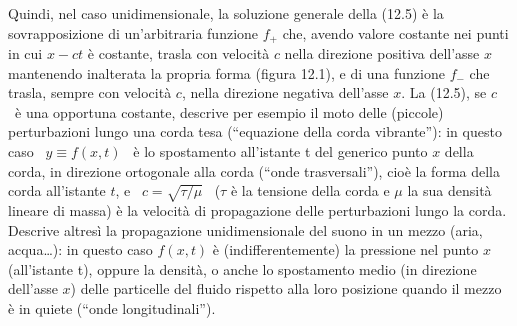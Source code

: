 Quindi, nel caso unidimensionale, la soluzione generale della (12.5) \`e la
sovrapposizione di un'arbitraria funzione $f_+$ che, avendo valore costante nei
punti in cui $x-ct$ \`e costante, trasla con velocit\`a $c$ nella direzione
positiva dell'asse $x$ mantenendo inalterata la propria forma (figura 12.1), e
di una funzione $f_-$ che trasla, sempre con velocit\`a $c$, nella direzione
negativa dell'asse $x$.
La (12.5), se $c$ \ \`e una opportuna costante, descrive per esempio il moto
delle (piccole) perturbazioni lungo una corda tesa (``equazione della corda
vibrante''): in questo caso \ $y\equiv f(x,t)$ \ \`e lo spostamento all'istante
t del generico punto $x$ della corda, in direzione ortogonale alla corda (``onde
trasversali''), cio\`e la forma della corda all'istante $t$, e
\ $c=\sqrt{\tau/\mu}$ \ ($\tau$ \`e la tensione della corda e $\mu$ la sua
densit\`a lineare di massa) \`e la velocit\`a di propagazione delle
perturbazioni lungo la corda.\\
Descrive altres\`i la propagazione unidimensionale del suono in un mezzo (aria,
acqua\dots): in questo caso $f(x,t)$ \`e (indifferentemente) la pressione nel
punto $x$ (all'istante t), oppure la densit\`a, o anche lo spostamento medio (in
direzione dell'asse $x$) delle particelle del fluido rispetto alla loro
posizione quando il mezzo \`e in quiete (``onde longitudinali'').

